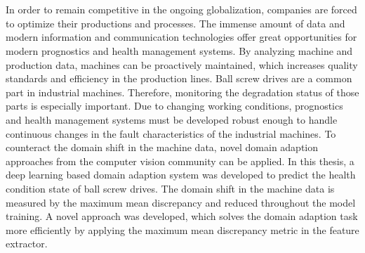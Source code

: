 \chapter{\abstractname}

In order to remain competitive in the ongoing globalization, companies are forced to optimize their productions and processes. The immense amount of data and modern information and communication technologies offer great opportunities for modern prognostics and health management systems. By analyzing machine and production data, machines can be proactively maintained, which increases quality standards and efficiency in the production lines. Ball screw drives are a common part in industrial machines. Therefore, monitoring the degradation status of those parts is especially important. Due to changing working conditions, prognostics and health management systems must be developed robust enough to handle continuous changes in the fault characteristics of the industrial machines. To counteract the domain shift in the machine data, novel domain adaption approaches from the computer vision community can be applied. In this thesis, a deep learning based domain adaption system was developed to predict the health condition state of ball screw drives. The domain shift in the machine data is measured by the maximum mean discrepancy and reduced throughout the model training. A novel approach was developed, which solves the domain adaption task more efficiently by applying the maximum mean discrepancy metric in the feature extractor. 


\makeatletter
{}
{\renewcommand{\abstractname}{Kurzfassung}}
{\renewcommand{\abstractname}{Abstract}}
\makeatother

\chapter{\abstractname}

